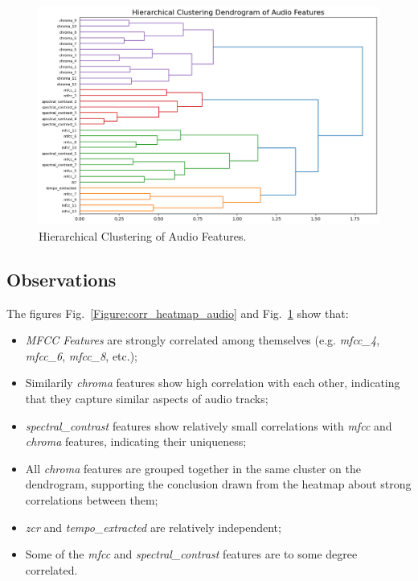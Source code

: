 \begin{center}
\begin{figure}[H]
  \centering
  \includegraphics[width=6in]{img/dendrogram_audio.png}
  \caption{Hierarchical Clustering of Audio Features.}
  \label{Figure:dendrogram_audio}
\end{figure}
\end{center}


\subsection*{Observations}
The figures Fig.~\ref{Figure:corr_heatmap_audio} and
Fig.~\ref{Figure:dendrogram_audio} show that:
\begin{itemize}
  \item \textit{MFCC Features} are strongly correlated among themselves (e.g.
    \textit{mfcc\_4}, \textit{mfcc\_6}, \textit{mfcc\_8}, etc.);
  \item Similarily \textit{chroma} features show high correlation with each
    other, indicating that they capture similar aspects of audio tracks;
  \item \textit{spectral\_contrast} features show relatively small
    correlations with \textit{mfcc} and  \textit{chroma} features, indicating 
    their uniqueness;
  \item All \textit{chroma} features are grouped together in the same cluster
    on the dendrogram, supporting the conclusion drawn from the heatmap about
    strong correlations between them;
  \item \textit{zcr} and \textit{tempo\_extracted} are relatively independent;
  \item Some of the \textit{mfcc} and \textit{spectral\_contrast} features
    are to some degree correlated.
\end{itemize}

